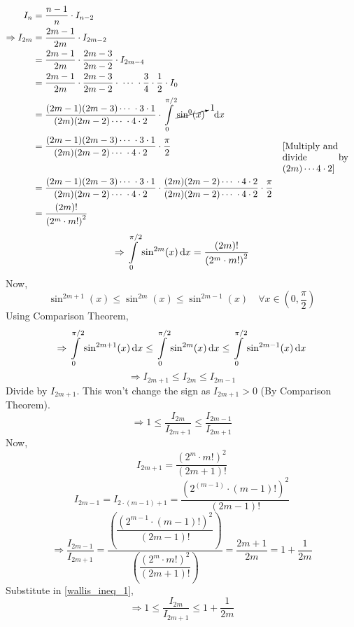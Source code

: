 \documentclass[14]{article}
\theoremstyle{definition}
\theoremstyle{case}
\begin{document}
\begin{align*}
I_n &= \dfrac{n-1}{n} \cdot I_{n-2}\\
\Rightarrow I_{2m} &= \dfrac{2m-1}{2m} \cdot I_{2m-2}\\
&= \dfrac{2m-1}{2m} \cdot \dfrac{2m-3}{2m-2} \cdot I_{2m-4}\\
&= \dfrac{2m-1}{2m} \cdot \dfrac{2m-3}{2m-2} \cdot \; \cdots \; \cdot \dfrac34 \cdot \dfrac12 \cdot I_0\\
&= \dfrac{ (2m-1)(2m-3) \cdots \; \cdot 3 \cdot 1 }{(2m)(2m-2) \cdots\; \cdot 4 \cdot 2} \cdot \int\limits_0^{\pi/2} \cancelto{1}{\sin^0(x)}\;\;\; \dif x\\
&= \dfrac{ (2m-1)(2m-3) \cdots \; \cdot 3 \cdot 1 }{(2m)(2m-2) \cdots\; \cdot 4 \cdot 2} \cdot \dfrac{\pi}{2} && \parbox[t]{2.5cm}{[Multiply and \\divide by \begin{math}{(2m) \cdots4\cdot 2}\end{math}]}\\
&= \dfrac{ (2m-1)(2m-3) \cdots \; \cdot 3 \cdot 1 }{(2m)(2m-2) \cdots\; \cdot 4 \cdot 2} \cdot \dfrac{(2m)(2m-2) \cdots\; \cdot 4 \cdot 2}{(2m)(2m-2) \cdots\; \cdot 4 \cdot 2} \cdot \dfrac{\pi}{2}\\
&= \dfrac{(2m)!}{\left(2^m \cdot m!\right)^2}
\end{align*}
\[\Rightarrow \int\limits_0^{\pi/2} \sin^{2m}(x) \dif x = \dfrac{(2m)!}{\left(2^m \cdot m!\right)^2}\]
Now,
\nopagebreak
\[\sin^{2m+1}(x) \leq \sin^{2m}(x) \leq \sin^{2m-1}(x) \quad \forall x \in \left( 0, \dfrac{\pi}{2} \right)\]
Using Comparison Theorem,
\[\Rightarrow \int\limits_0^{\pi/2} \sin^{2m+1}(x) \dif x \leq \int\limits_0^{\pi/2} \sin^{2m}(x) \dif x \leq \int\limits_0^{\pi/2} \sin^{2m-1}(x) \dif x\]
\[\Rightarrow I_{2m+1} \leq I_{2m} \leq I_{2m-1}\]
Divide by $I_{2m+1}$. This won't change the sign as $I_{2m+1}>0$ (By Comparison Theorem).
\begin{equation}\label{wallis_ineq_1}
\Rightarrow 1 \leq \dfrac{I_{2m}}{I_{2m+1}} \leq \dfrac{I_{2m-1}}{I_{2m+1}}
\end{equation}
Now,
\[I_{2m+1} = \dfrac{\left(2^m \cdot m!\right)^2}{(2m+1)!}\]
\[I_{2m-1} = I_{2\cdot(m-1)+1} = \dfrac{\left(2^{(m-1)} \cdot (m-1)!\right)^2}{(2m-1)!}\]
\[\Rightarrow\dfrac{I_{2m-1}}{I_{2m+1}} = 
\dfrac{ \left( \dfrac{\left(2^{m-1} \cdot (m-1)!\right)^2}{(2m-1)!} \right) } 
{ \left( \dfrac{\left(2^m \cdot m!\right)^2}{(2m+1)!} \right) } = \dfrac{2m+1}{2m} =  1 + \dfrac1{2m}\]
Substitute in \eqref{wallis_ineq_1},
\[\Rightarrow 1 \leq \dfrac{I_{2m}}{I_{2m+1}} \leq 1 + \dfrac1{2m}\]
\end{document}
